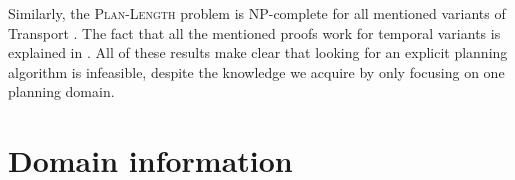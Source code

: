 Similarly, the \textsc{Plan-Length} problem is NP-complete for all mentioned variants of Transport
\citep[Section~3.6]{Helmert2001a}.
The fact that all the mentioned proofs work for temporal variants is explained in \citet[Section~3.5]{Helmert2001a}.
All of these results make clear that looking for an explicit planning algorithm is infeasible,
despite the knowledge we acquire by only focusing on one planning domain.












\section{Domain information}\label{domain-info}

